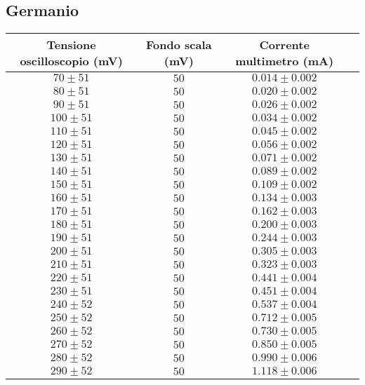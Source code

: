 \documentclass[]{article}
\begin{document}
\subsection{Germanio}
\begin{center}
	\begin{tabular}{|c|c|c|c|}
		\hline
		Tensione oscilloscopio (mV)& Fondo scala (mV) & Corrente multimetro (mA) \\
		\hline
		$ 70\pm 51 $ &$ 50 $ & $ 0.014\pm 0.002 $ \\
		\hline
		$ 80\pm 51 $ &$ 50 $ & $ 0.020\pm 0.002 $ \\
		\hline
		$ 90\pm 51 $ &$ 50 $ & $ 0.026\pm 0.002 $ \\
		\hline
		$ 100\pm 51 $ &$ 50 $ & $ 0.034\pm 0.002 $ \\
		\hline
		$110\pm 51 $ &$ 50 $ & $ 0.045\pm 0.002 $ \\
		\hline
		$ 120\pm 51 $ &$ 50 $ & $ 0.056\pm 0.002 $ \\
		\hline
		$ 130\pm 51 $ &$ 50 $ & $ 0.071\pm 0.002 $ \\
		\hline
		$ 140\pm 51 $ &$ 50 $ & $ 0.089\pm 0.002 $ \\
		\hline
		$ 150\pm 51 $ &$ 50 $ & $ 0.109\pm 0.002 $ \\
		\hline
		$ 160\pm 51 $ &$ 50 $ & $ 0.134\pm 0.003 $ \\
		\hline
		$ 170\pm 51 $ &$ 50 $ & $ 0.162\pm 0.003 $ \\
		\hline
		$ 180\pm 51 $ &$ 50 $ & $ 0.200\pm 0.003 $ \\
		\hline
		$ 190\pm 51 $ &$ 50 $ & $ 0.244\pm 0.003 $ \\
		\hline
		$ 200\pm 51 $ &$ 50 $ & $ 0.305\pm 0.003 $ \\
		\hline
		$ 210\pm 51 $ &$ 50 $ & $ 0.323\pm 0.003 $ \\
		\hline
		$ 220\pm 51 $ &$ 50 $ & $ 0.441\pm 0.004 $ \\
		\hline
		$ 230\pm 51 $ &$ 50 $ & $ 0.451\pm 0.004 $ \\
		\hline
		$ 240\pm 52 $ &$ 50 $ & $ 0.537\pm 0.004 $ \\
		\hline
		$ 250\pm 52 $ &$ 50 $ & $ 0.712\pm 0.005 $ \\
		\hline
		$ 260\pm 52 $ &$ 50 $ & $ 0.730\pm 0.005 $ \\
		\hline
		$ 270\pm 52 $ &$ 50 $ & $ 0.850\pm 0.005 $ \\
		\hline
		$ 280\pm 52 $ &$ 50 $ & $ 0.990\pm 0.006 $ \\
		\hline
		$ 290\pm 52 $ &$ 50 $ & $ 1.118\pm 0.006 $ \\
		\hline
	\end{tabular}
\end{center}
\end{document}
